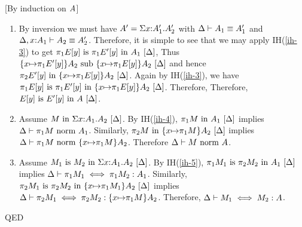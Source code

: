 \documentclass{article}
\theoremstyle{break}
\newcommand{\qed}{\mbox{QED}}
\newenvironment{proof}{\noindent{\bf Proof:}\hspace*{0.5em}}{\hspace*{\fill}\qed}
\begin{document}
\begin{proof}[By induction on $A$]
\begin{itemize}
\begin{enumerate}
\item By inversion we must have $A'=\Sigma x{:}A'_1.A'_2$ with
$\Delta\vdash A_1 \equiv A'_1$ and
$\Delta,x{:}A_1\vdash A_2 \equiv A'_2$.
Therefore, it is simple to see that we may apply IH(\ref{ih-3}) to get
${{\pi_{1}}{E[y]}}\mathrm{\ is\ }{{\pi_{1}}{E'[y]}}\mathrm{\ in\ }{A_1}\ [\Delta]$,
Thus
${\{x{\mapsto}{\pi_{1}}{E'[y]}\}{A_2}}\mathrm{\ sub\ }{\{x{\mapsto}{\pi_{1}}{E[y]}\}{A_2}}\ [\Delta]$ and hence
${{\pi_{2}}{E'[y]}}\mathrm{\ in\ }{\{x{\mapsto}{\pi_{1}}{E[y]}\}{A_2}}\ [\Delta]$.
Again by IH(\ref{ih-3}), we have
${{\pi_{1}}{E[y]}}\mathrm{\ is\ }{{\pi_{1}}{E'[y]}}\mathrm{\ in\ }{\{x{\mapsto}{\pi_{1}}{E[y]}\}{A_2}}\ [\Delta]$.
Therefore, 
Therefore, ${E[y]}\mathrm{\ is\ }{E'[y]}\mathrm{\ in\ }{A}\ [\Delta]$.
\item Assume
${M}\mathrm{\ in\ }{\Sigma x{:}A_1.A_2}\ [\Delta]$.
By IH(\ref{ih-4}), ${{\pi_{1}}{M}}\mathrm{\ in\ }{A_1}\ [\Delta]$ implies
${\Delta}\vdash{{\pi_{1}}{M}}\mbox{\ norm\ }{A_1}$.  Similarly,
${{\pi_{2}}{M}}\mathrm{\ in\ }{\{x{\mapsto}{\pi_{1}}{M}\}{A_2}}\ [\Delta]$ implies
${\Delta}\vdash{{\pi_{1}}{M}}\mbox{\ norm\ }{\{x{\mapsto}{\pi_{1}}{M}\}{A_2}}$.
Therefore ${\Delta}\vdash{M}\mbox{\ norm\ }{A}$.
\item Assume ${M_1}\mathrm{\ is\ }{M_2}\mathrm{\ in\ }{\Sigma x{:}A_1.A_2}\ [\Delta]$.
By IH(\ref{ih-5}), 
${{\pi_{1}}{M_1}}\mathrm{\ is\ }{{\pi_{2}}{M_2}}\mathrm{\ in\ }{A_1}\ [\Delta]$ implies
$\Delta\vdash {\pi_{1}}{M_1} \iff {\pi_{1}}{M_2} : A_1$.  Similarly,
${{\pi_{2}}{M_1}}\mathrm{\ is\ }{{\pi_{2}}{M_2}}\mathrm{\ in\ }{\{x{\mapsto}{\pi_{1}}{M_1}\}{A_2}}\ [\Delta]$ implies
$\Delta\vdash {\pi_{2}}{M_1} \iff {\pi_{2}}{M_2} : \{x{\mapsto}{\pi_{1}}{M}\}{A_2}$.
Therefore, $\Delta\vdash M_1 \iff M_2 : A$.
\end{enumerate}
\end{itemize}
\end{proof}
\end{document}

